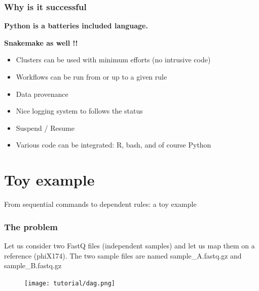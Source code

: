 \documentclass{beamer}
\begin{document}
\begin{frame}
 \frametitle{Why is it successful}
 \centering
 \textbf{Python is a batteries included language. }

 \vspace{1cm}
 \pause
 \textbf{Snakemake as well !!}
 
 \pause
   \begin{itemize}
    \item  Clusters can be used with minimum efforts (no intrusive code)
    \item  Workflows can be run from or up to a given rule
    \item  Data provenance
    \item  Nice logging system to follows the status
    \item  Suspend /  Resume 
    \item  Various code can be integrated: R, bash, and of course Python
   \end{itemize}   
 
\end{frame}





\section{Toy example}

\begin{frame}[plain]
 \centering
 \begin{Huge}
 From sequential commands to dependent rules: a toy example
 \end{Huge}
\end{frame}



\begin{frame}
\frametitle{The problem}
Let us consider two FastQ files (independent samples) and let us map them on a reference (phiX174). The two 
sample files are named sample\_A.fastq.gz and sample\_B.fastq.gz
  \begin{figure}
\texttt{[image: tutorial/dag.png]}
  \end{figure}
\end{frame}

 
\end{document}
